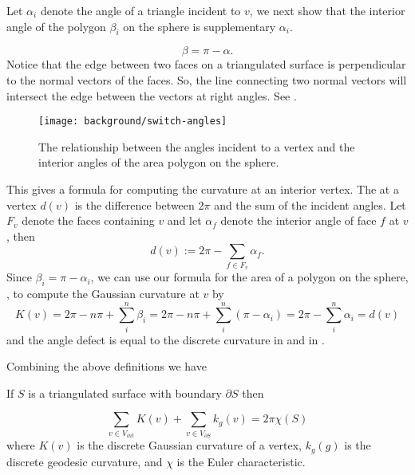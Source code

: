 Let $\alpha_i$ denote the angle of a triangle incident to $v$, 
we next show that the interior angle of the polygon $\beta_i$ on the 
sphere is supplementary $\alpha_i$.

\begin{equation} \label{eqn:switcheroo}
\beta=\pi-\alpha.
\end{equation}
Notice that the edge between two faces
on a triangulated surface
is perpendicular to the normal vectors of the faces.
So, the line connecting two normal vectors will intersect the edge between the vectors 
at right angles. See .


\begin{figure}[htb]
\centering
\texttt{[image: background/switch-angles]}
\caption{The relationship between the angles incident to a vertex and
the interior angles of the area polygon on the sphere.}
\label{fig:switcheroo}
\end{figure}



This gives a  formula for computing the curvature at an interior vertex.
The  at a vertex $d(v)$ is the difference between $2\pi$ and
the sum of the incident angles.  Let $F_v$ denote the faces containing $v$  
and let $\alpha_f$  denote the interior  angle of face $f$ at $v$, then
\begin{equation} \label{eqn:defect}
d(v):=2\pi -\sum_{f\in F_v}\alpha_f.
\end{equation}
Since $\beta_i=\pi-\alpha_i$,
we can use our formula for the area of a polygon on the sphere,
, to compute the Gaussian curvature at $v$
by
$$K(v)=2\pi -n\pi+\sum_{i}^n \beta_i=2\pi-n\pi +\sum_{i}^n (\pi-\alpha_i) =2\pi-\sum_i^n\alpha_i=d(v)$$
 and the
 angle defect is equal to the discrete curvature in 
 and in .







Combining the above definitions  we have

\begin{theorem} \label{thm:g-b-d}

If $S$ is a triangulated surface with  boundary $\partial S$ then

$$\sum_{v\in V_{int}} K(v) + \sum_{v\in V_{\partial S}} k_g(v) = 2\pi \chi(S)$$
where $K(v)$ is the discrete Gaussian curvature
of a vertex, $k_g(g)$ is the discrete geodesic curvature,  and
$\chi$ is the Euler characteristic.
\end{theorem}





